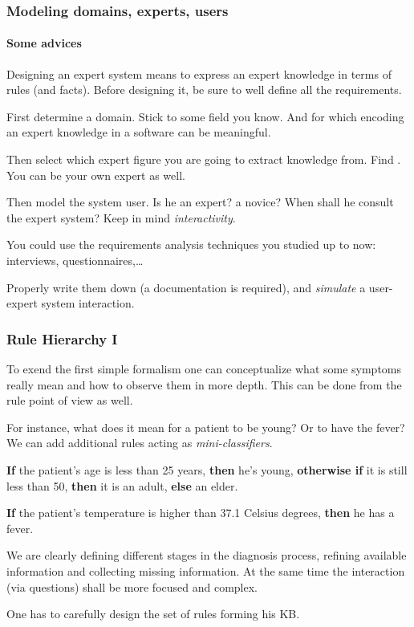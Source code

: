 \documentclass[xcolor={usenames,dvipsnames,svgnames}, compress]{beamer}
\begin{document}
\begin{frame}[t]
  \frametitle{Modeling domains, experts, users}
  \framesubtitle{Some advices}
  Designing an expert system means to express an expert knowledge in
  terms of rules (and facts). Before designing it, be sure to well define all
  the requirements.\par\bigskip

  First determine a domain. Stick to some field you know. And for
  which encoding an expert knowledge in a software can be meaningful.\par\bigskip
  Then select which expert figure you are going to extract knowledge
  from. Find . You can be your own expert as well. 
  \par\bigskip
  Then model the system user. Is he an expert? a novice? When shall
  he consult the expert system? Keep in mind \emph{interactivity}.\par\bigskip

  You could use the requirements analysis techniques you studied up to
  now: interviews, questionnaires,\dots\par
  Properly write them down (a documentation is required), and \emph{simulate} a user-expert system interaction.
  
\end{frame}

\begin{frame}
  \frametitle{Rule Hierarchy I}
  To exend the first simple formalism one can conceptualize what some
  symptoms really mean and how to observe them in more depth.
  This can be done from the rule point of view as well.\par\bigskip

  For instance, what does it mean for a  patient to be young? Or to
  have the fever? We can add additional rules acting as \emph{mini-classifiers}.\par\bigskip
  {\color{ny-orange}\textbf{If} the patient's age is less than 25 years, \textbf{then} he's young, \textbf{otherwise if}
  it is still less than 50, \textbf{then} it is an adult, \textbf{else} an
  elder.\par
  \textbf{If} the patient's temperature is higher than 37.1 Celsius degrees,
  \textbf{then} he has a fever.\par \bigskip}

  We are clearly defining different stages in the diagnosis process,
  refining available information and collecting missing
  information. At the same time the interaction (via questions) shall
  be more focused and complex.\par
  One has to carefully design the set of rules forming his KB.
  
   
\end{frame}
\end{document}

